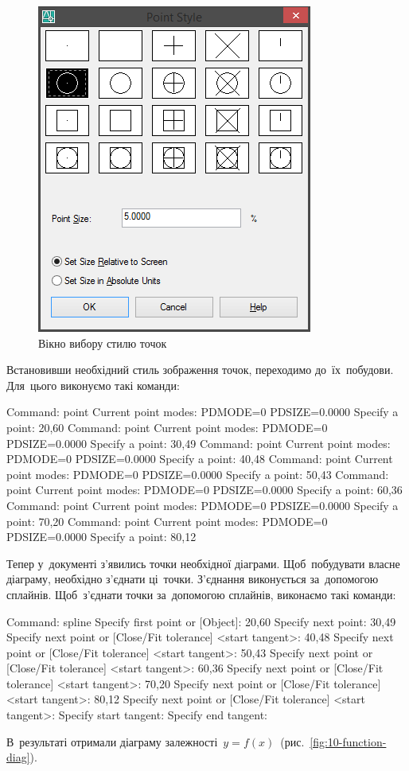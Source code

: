 \documentclass[
	a4paper,
	oneside,
	BCOR = 10mm,
	DIV = 12,
	12pt,
	headings = normal,
]{scrartcl}
\begin{document}
			\begin{figure}[!htbp]
				\centering
				\includegraphics[height=12\baselineskip]{./assets/y04s01-csdt-lab-01-01-p11.png}
				\caption{Вікно вибору стилю точок}
				\label{fig:09-point-style}
			\end{figure}

			Встановивши необхідний стиль зображення точок, переходимо до~їх~побудови. Для~цього виконуємо такі команди:
			\begin{codegeneric}
				Command: point
				Current point modes:  PDMODE=0  PDSIZE=0.0000
				Specify a point: 20,60
				Command: point
				Current point modes:  PDMODE=0  PDSIZE=0.0000
				Specify a point: 30,49
				Command: point
				Current point modes:  PDMODE=0  PDSIZE=0.0000
				Specify a point: 40,48
				Command: point
				Current point modes:  PDMODE=0  PDSIZE=0.0000
				Specify a point: 50,43
				Command: point
				Current point modes:  PDMODE=0  PDSIZE=0.0000
				Specify a point: 60,36
				Command: point
				Current point modes:  PDMODE=0  PDSIZE=0.0000
				Specify a point: 70,20
				Command: point
				Current point modes:  PDMODE=0  PDSIZE=0.0000
				Specify a point: 80,12
			\end{codegeneric}
			Тепер у~документі з'явились точки необхідної діаграми. Щоб~побудувати власне діаграму, необхідно з'єднати ці~точки. З'єднання виконується за~допомогою сплайнів. Щоб~з'єднати точки за~допомогою сплайнів, виконаємо такі команди:
			\begin{codegeneric}
				Command: spline
				Specify first point or [Object]: 20,60
				Specify next point: 30,49
				Specify next point or [Close/Fit tolerance] <start tangent>: 40,48
				Specify next point or [Close/Fit tolerance] <start tangent>: 50,43
				Specify next point or [Close/Fit tolerance] <start tangent>: 60,36
				Specify next point or [Close/Fit tolerance] <start tangent>: 70,20
				Specify next point or [Close/Fit tolerance] <start tangent>: 80,12
				Specify next point or [Close/Fit tolerance] <start tangent>:
				Specify start tangent:
				Specify end tangent:
			\end{codegeneric}
			В~результаті отримали діаграму залежності~$y = f(x)$~(рис.~\ref{fig:10-function-diag}).
\end{document}
